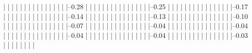             |          |          |          |          |          |          |          |          
            |          |          |          |          |          |          |          |--0.28%
            |          |          |          |          |          |          |          |          
            |          |          |          |          |          |          |          |--0.25%
            |          |          |          |          |          |          |          |          
            |          |          |          |          |          |          |          |--0.17%
            |          |          |          |          |          |          |          |          
            |          |          |          |          |          |          |          |--0.14%
            |          |          |          |          |          |          |          |          
            |          |          |          |          |          |          |          |--0.13%
            |          |          |          |          |          |          |          |          
            |          |          |          |          |          |          |          |--0.10%
            |          |          |          |          |          |          |          |          
            |          |          |          |          |          |          |          |--0.07%
            |          |          |          |          |          |          |          |          
            |          |          |          |          |          |          |          |--0.04%
            |          |          |          |          |          |          |          |          
            |          |          |          |          |          |          |          |--0.04%
            |          |          |          |          |          |          |          |          
            |          |          |          |          |          |          |          |--0.04%
            |          |          |          |          |          |          |          |          
            |          |          |          |          |          |          |          |--0.04%
            |          |          |          |          |          |          |          |          
            |          |          |          |          |          |          |          |--0.03%
            |          |          |          |          |          |          |          |          
